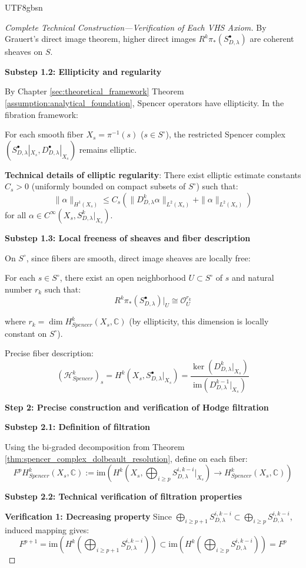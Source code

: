 \documentclass[a4paper,12pt]{extarticle}
\theoremstyle{definition}
\begin{document}
\begin{CJK}{UTF8}{gbsn}
\begin{proof}[Complete Technical Construction—Verification of Each VHS Axiom]
By Grauert's direct image theorem, higher direct images $R^k\pi_*(S^{\bullet}_{D,\lambda})$ are coherent sheaves on $S$.

\textbf{Substep 1.2: Ellipticity and regularity}

By Chapter \ref{sec:theoretical_framework} Theorem \ref{assumption:analytical_foundation}, Spencer operators have ellipticity. In the fibration framework:

For each smooth fiber $X_s = \pi^{-1}(s)$ ($s \in S^\circ$), the restricted Spencer complex $(S^{\bullet}_{D,\lambda}|_{X_s}, D^{\bullet}_{D,\lambda}|_{X_s})$ remains elliptic.

\textbf{Technical details of elliptic regularity}:
There exist elliptic estimate constants $C_s > 0$ (uniformly bounded on compact subsets of $S^\circ$) such that:
$$\|\alpha\|_{H^1(X_s)} \leq C_s(\|D^k_{D,\lambda}\alpha\|_{L^2(X_s)} + \|\alpha\|_{L^2(X_s)})$$
for all $\alpha \in C^\infty(X_s, S^k_{D,\lambda}|_{X_s})$.

\textbf{Substep 1.3: Local freeness of sheaves and fiber description}

On $S^\circ$, since fibers are smooth, direct image sheaves are locally free:

For each $s \in S^\circ$, there exist an open neighborhood $U \subset S^\circ$ of $s$ and natural number $r_k$ such that:
$$R^k\pi_*(S^{\bullet}_{D,\lambda})|_U \cong \mathcal{O}_U^{r_k}$$

where $r_k = \dim H^k_{Spencer}(X_s, \mathbb{C})$ (by ellipticity, this dimension is locally constant on $S^\circ$).

Precise fiber description:
$$(\mathcal{H}^k_{Spencer})_s = H^k(X_s, S^{\bullet}_{D,\lambda}|_{X_s}) = \frac{\ker(D^k_{D,\lambda}|_{X_s})}{\text{im}(D^{k-1}_{D,\lambda}|_{X_s})}$$

\textbf{Step 2: Precise construction and verification of Hodge filtration}

\textbf{Substep 2.1: Definition of filtration}

Using the bi-graded decomposition from Theorem \ref{thm:spencer_complex_dolbeault_resolution}, define on each fiber:
$$F^p H^k_{Spencer}(X_s, \mathbb{C}) := \text{im}\left(H^k\left(X_s, \bigoplus_{i \geq p} S^{i,k-i}_{D,\lambda}|_{X_s}\right) \to H^k_{Spencer}(X_s, \mathbb{C})\right)$$

\textbf{Substep 2.2: Technical verification of filtration properties}

\textbf{Verification 1: Decreasing property}
Since $\bigoplus_{i \geq p+1} S^{i,k-i}_{D,\lambda} \subset \bigoplus_{i \geq p} S^{i,k-i}_{D,\lambda}$, induced mapping gives:
$$F^{p+1} = \text{im}(H^k(\bigoplus_{i \geq p+1} S^{i,k-i}_{D,\lambda})) \subset \text{im}(H^k(\bigoplus_{i \geq p} S^{i,k-i}_{D,\lambda})) = F^p$$


\end{proof}
\end{CJK}
\end{document}
